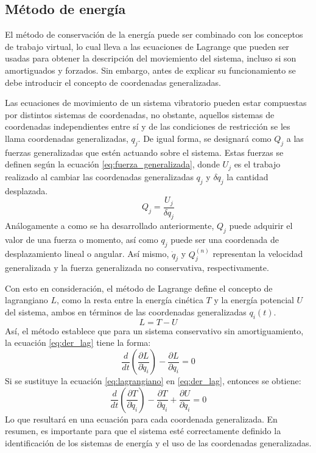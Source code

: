 \subsection{Método de energía}
\label{sec:metodo_energia}
El método de conservación de la energía puede ser combinado con los conceptos de trabajo virtual, lo cual lleva a las ecuaciones de Lagrange que pueden ser usadas para obtener la descripción del moviemiento del sistema, incluso si son amortiguados y forzados. Sin embargo, antes de explicar su funcionamiento se debe introducir el concepto de coordenadas generalizadas.

Las ecuaciones de movimiento de un sistema vibratorio pueden estar compuestas por distintos sistemas de coordenadas, no obstante, aquellos sistemas de coordenadas independientes entre sí y de las condiciones de restricción se les llama coordenadas generalizadas, $q_j$. De igual forma, se designará como $Q_j$ a las fuerzas generalizadas que estén actuando sobre el sistema. Estas fuerzas se definen según la ecuación \ref{eq:fuerza_generalizada}, donde $U_j$ es el trabajo realizado al cambiar las coordenadas generalizadas $q_j$ y $\delta q_j$ la cantidad desplazada. 
\begin{equation}\label{eq:fuerza_generalizada}
	Q_j = \frac{U_j}{\delta q_j}
\end{equation} 
Análogamente a como se ha desarrollado anteriormente, $Q_j$ puede adquirir el valor de una fuerza o momento, así como $q_j$ puede ser una coordenada de desplazamiento lineal o angular. Así mismo, $\dot{q}_j$ y $Q_j^{(n)}$ representan la velocidad generalizada y la fuerza generalizada no conservativa, respectivamente.

Con esto en consideración, el método de Lagrange define el concepto de lagrangiano $L$, como la resta entre la energía cinética $T$ y la energía potencial $U$ del sistema, ambos en términos de las coordenadas generalizadas $q_i(t)$.
\begin{equation}\label{eq:lagrangiano}
	L = T - U
\end{equation} 
Así, el método establece que para un sistema conservativo sin amortiguamiento, la ecuación \ref{eq:der_lag} tiene la forma:
\begin{equation}\label{eq:der_lag}
	\frac{d}{dt}\left(\frac{\partial L}{\partial \dot{q}_i}\right) - \frac{\partial L}{\partial q_i} = 0
\end{equation}
Si se sustituye la ecuación \ref{eq:lagrangiano} en \ref{eq:der_lag}, entonces se obtiene:
\begin{equation}\label{eq:der_lagconsv}
	\frac{d}{dt}\left(\frac{\partial T}{\partial \dot{q}_i}\right) - \frac{\partial T}{\partial q_i} + \frac{\partial U}{\partial q_i} = 0
\end{equation}
Lo que resultará en una ecuación para cada coordenada generalizada. En resumen, es importante para que el sistema esté correctamente definido la identificación de los sistemas de energía y el uso de las coordenadas generalizadas. 



